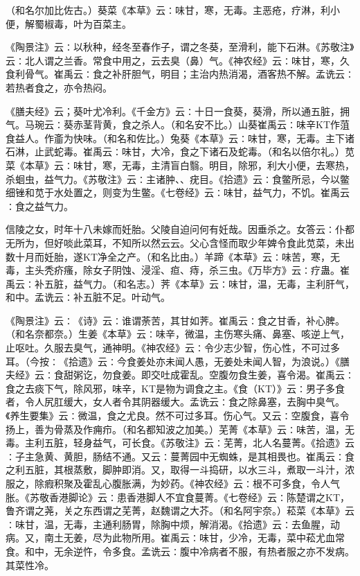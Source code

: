 \documentclass[a4paper,12pt,UTF8,twoside]{ctexbook}
\begin{document}
（和名尔加比佐古。）葵菜《本草》云∶味甘，寒，无毒。主恶疮，疗淋，利小便，解蜀椒毒，叶为百菜主。

《陶景注》云∶以秋种，经冬至春作子，谓之冬葵，至滑利，能下石淋。《苏敬注》云∶北人谓之兰香。常食中用之，云去臭（鼻）气。《神农经》云∶味甘，寒，久食利骨气。崔禹云∶食之补肝胆气，明目；主治内热消渴，酒客热不解。孟诜云∶若热者食之，亦令热闷。

《膳夫经》云；葵叶尤冷利。《千金方》云∶十日一食葵，葵滑，所以通五脏，拥气。马琬云∶葵赤茎背黄，食之杀人。（和名安不比。）山葵崔禹云∶味辛KT作菹食益人。作齑为快味。（和名和佐比。）兔葵《本草》云∶味甘，寒，无毒。主下诸石淋，止武蛇毒。崔禹云∶味甘，大冷，食之下诸石及蛇毒。（和名以倍尔礼。）苋菜《本草》云∶味甘，寒，无毒，主清盲白翳。明目，除邪，利大小便，去寒热，杀蛔虫，益气力。《苏敬注》云∶主诸肿、、疣目。《拾遗》云∶食鳖所忌，今以鳖细锉和苋于水处置之，则变为生鳖。《七卷经》云∶味甘，益气力，不饥。崔禹云∶食之益气力。

信陵之女，时年十八未嫁而妊胎。父陵自迫问何有妊哉。因垂杀之。女答云∶仆都无所为，但好啖此菜耳，不知所以然云云。父心含怪而取少年婢令食此苋菜，未出数十月而妊胎，遂KT净全之产。（和名比由。）羊蹄《本草》云∶味苦，寒，无毒，主头秃疥瘙，除女子阴蚀、浸淫、疸、痔，杀三虫。《万毕方》云∶疗蛊。崔禹云∶补五脏，益气力。（和名志。）荠《本草》云∶味甘，温，无毒，主利肝气，和中。孟诜云∶补五脏不足。叶动气。

《陶景注》云∶《诗》云∶谁谓荼苦，其甘如荠。崔禹云∶食之甘香，补心脾。（和名奈都奈。）生姜《本草》云∶味辛，微温，主伤寒头痛、鼻塞、咳逆上气，止呕吐。久服去臭气，通神明。《神农经》云∶令少志少智，伤心性，不可过多耳。（今按∶《拾遗》云∶今食姜处亦未闻人愚，无姜处未闻人智，为浪说。）《膳夫经》云∶食甜粥讫，勿食姜。即交吐成霍乱。空腹勿食生姜，喜令渴。崔禹云∶食之去痰下气，除风邪，味辛，KT是物为调食之主。《食（KT）》云∶男子多食者，令人尻肛缓大，女人者令其阴器缓大。孟诜云∶食之除鼻塞，去胸中臭气。《养生要集》云∶微温，食之尤良。然不可过多耳。伤心气。又云∶空腹食，喜令扬上，善为骨蒸及作痈疖。（和名都知波之加美。）芜菁《本草》云∶味苦，温，无毒。主利五脏，轻身益气，可长食。《苏敬注》云∶芜菁，北人名蔓菁。《拾遗》云∶子主急黄、黄胆，肠结不通。又云∶蔓菁园中无蜘蛛，是其相畏也。崔禹云∶食之利五脏，其根蒸敷，脚肿即消。又，取得一斗捣研，以水三斗，煮取一斗汁，浓服之，除瘕积聚及霍乱心腹胀满，为妙药。《神农经》云∶根不可多食，令人气胀。《苏敬香港脚论》云∶患香港脚人不宜食蔓菁。《七卷经》云∶陈楚谓之KT，鲁齐谓之荛，关之东西谓之芜菁，赵魏谓之大芥。（和名阿宇奈。）菘菜《本草》云∶味甘，温，无毒，主通利肠胃，除胸中烦，解消渴。《拾遗》云∶去鱼腥，动病。又，南土无姜，尽为此物所用。崔禹云∶味甘，少冷，无毒，菜中菘尤血常食。和中，无余逆忤，令多食。孟诜云∶腹中冷病者不服，有热者服之亦不发病。其菜性冷。
\end{document}
